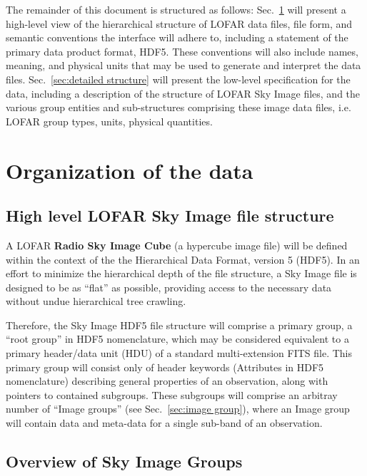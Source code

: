 \documentclass[a4paper,10pt,bibtotoc]{scrartcl}
\begin{document}
The remainder of this document is structured as follows:
Sec.~\ref{sec:organization of the data} will present a high-level view of the
hierarchical structure of LOFAR data files, file form, and semantic
conventions the interface will adhere to, including a statement of the
primary data product format, HDF5. These conventions will also include
names, meaning, and physical units that may be used to generate and
interpret the data files. Sec.~\ref{sec:detailed structure} will
present the low-level specification for the data, including a
description of the structure of LOFAR Sky Image files, and the various
group entities and sub-structures comprising these image data files,
i.e. LOFAR group types, units, physical quantities.


\section{Organization of the data}
\label{sec:organization of the data}

\subsection{High level LOFAR Sky Image file structure}

A LOFAR \textbf{Radio Sky Image Cube} (a hypercube image file) will be defined
within the context of the the Hierarchical Data Format, version 5
(HDF5). In an effort to minimize the hierarchical depth of the file
structure, a Sky Image file is designed to be as ``flat'' as possible,
providing access to the necessary data without undue hierarchical tree
crawling.

Therefore, the Sky Image HDF5 file structure will comprise a primary
group, a ``root group'' in HDF5 nomenclature, which may be considered
equivalent to a primary header/data unit (HDU) of a standard
multi-extension FITS file. This primary group will consist only of
header keywords (Attributes in HDF5 nomenclature) describing general
properties of an observation, along with pointers to contained
subgroups. These subgroups will comprise an arbitray number of
``Image groups'' (see Sec.~\ref{sec:image group}), where an Image
group will contain data and meta-data for a single sub-band of an
observation.

\subsection{Overview of Sky Image Groups}
\label{sec:overview of sky image groups}
\end{document}
